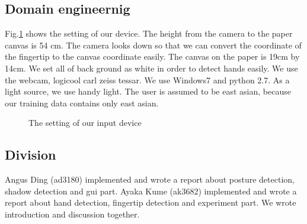 \subsection{Domain engineernig}
Fig.\ref{fig:1} shows the setting of our device. The height from the camera to the paper canvas is 54 cm. The camera looks down so that we can convert the coordinate of the fingertip to the canvas coordinate easily. The canvas on the paper is 19cm by 14cm. We set all of back ground as white in order to detect hands easily. We use the webcam, logicool carl zeiss tessar. We use Windows7 and python 2.7. As a light source, we use handy light. The user is assumed to be east asian, because our training data contains only east asian.
\begin{figure}
 \caption{The setting of our input device}
 \label{fig:1}
\end{figure}
\subsection{Division}
Angus Ding (ad3180) implemented and wrote a report about posture detection, shadow detection and gui part.
Ayaka Kume (ak3682) implemented and wrote a report about hand detection, fingertip detection and experiment part.
We wrote introduction and discussion together.
